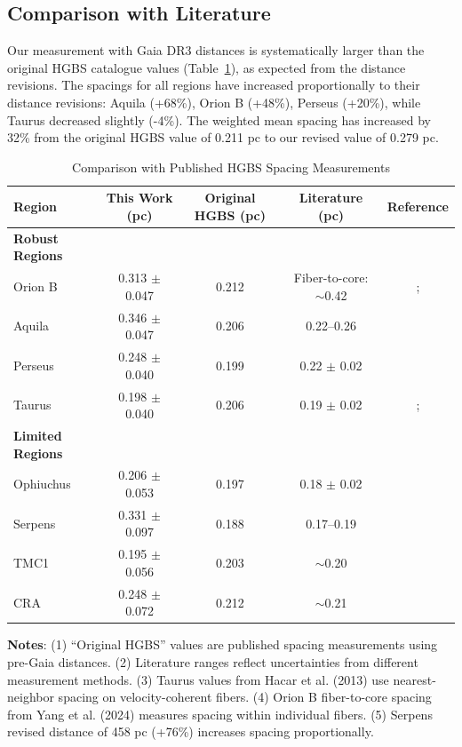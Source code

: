 \documentclass[twocolumn,longtitle,usenatbib]{mnras}
\begin{document}
\subsection{Comparison with Literature}

Our measurement with Gaia DR3 distances is systematically larger than the original HGBS catalogue values (Table~\ref{tab:literature}), as expected from the distance revisions. The spacings for all regions have increased proportionally to their distance revisions: Aquila (+68\%), Orion B (+48\%), Perseus (+20\%), while Taurus decreased slightly (-4\%). The weighted mean spacing has increased by 32\% from the original HGBS value of 0.211 pc to our revised value of 0.279 pc.

\begin{table}
\caption{Comparison with Published HGBS Spacing Measurements}
\label{tab:literature}
\begin{tabular}{lcccc}
\toprule
Region & This Work (pc) & Original HGBS (pc) & Literature (pc) & Reference \\
\midrule
\textbf{Robust Regions} &  &  &  &  \\
Orion B & 0.313 $\pm$ 0.047 & 0.212 & Fiber-to-core: $\sim$0.42 & \citet{Konyves2020}; \citet{Yang2024} \\
Aquila  & 0.346 $\pm$ 0.047 & 0.206 & 0.22--0.26 & \citet{Konyves2015} \\
Perseus & 0.248 $\pm$ 0.040 & 0.199 & 0.22 $\pm$ 0.02 & \citet{Andre2016} \\
Taurus  & 0.198 $\pm$ 0.040 & 0.206 & 0.19 $\pm$ 0.02 & \citet{Hacar2013}; \citet{Schmiedeke2021} \\
\midrule
\textbf{Limited Regions} &  &  &  &  \\
Ophiuchus & 0.206 $\pm$ 0.053 & 0.197 & 0.18 $\pm$ 0.02 & \citet{Konyves2020} \\
Serpens  & 0.331 $\pm$ 0.097 & 0.188 & 0.17--0.19 & \citet{Konyves2020} \\
TMC1     & 0.195 $\pm$ 0.056 & 0.203 & $\sim$0.20 & \citet{Hacar2013} \\
CRA      & 0.248 $\pm$ 0.072 & 0.212 & $\sim$0.21 & \citet{Konyves2020} \\
\bottomrule
\end{tabular}

\vspace{0.1in}
\footnotesize
\textbf{Notes}: (1) ``Original HGBS'' values are published spacing measurements using pre-Gaia distances. (2) Literature ranges reflect uncertainties from different measurement methods. (3) Taurus values from Hacar et al. (2013) use nearest-neighbor spacing on velocity-coherent fibers. (4) Orion B fiber-to-core spacing from Yang et al. (2024) measures spacing within individual fibers. (5) Serpens revised distance of 458 pc (+76\%) increases spacing proportionally.
\end{table}
\end{document}
